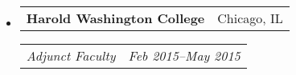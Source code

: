 \documentclass[10pt,letterpaper]{article}
\makeatletter
\newcommand{\headerrow}[2]
{\begin{tabular*}{\linewidth}{l@{\extracolsep{\fill}}r}
	#1 &
	#2 \\
\end{tabular*}}
\makeatother
\begin{document}
\begin{itemize}
	\parskip=-0.1em
	\item
	\headerrow
		{\textbf{Harold Washington College}}
		{Chicago, IL}
	\headerrow
		{\emph{Adjunct Faculty}}
		{\emph{Feb 2015--May 2015}}

%
\end{itemize}
\end{document}
